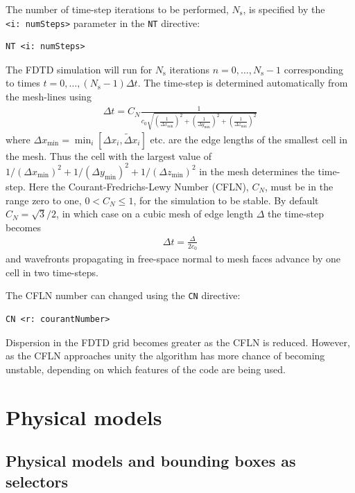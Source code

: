 \documentclass[onecolumn,a4paper]{article}
\numberwithin{equation}{section}
\begin{document}
The number of time-step iterations to be performed, $N_\mathrm{s}$, is specified by the
\texttt{<i:~numSteps>} parameter in the \texttt{NT} directive:
\begin{verbatim}
NT <i: numSteps>
\end{verbatim}
The FDTD simulation will run for $N_\mathrm{s}$ iterations $n=0,\ldots,N_\mathrm{s}-1$ 
corresponding to times $t=0,\ldots,(N_\mathrm{s}-1)\Delta t$. The time-step is determined
automatically from the mesh-lines using
\begin{eqnarray}
\Delta t = C_N \frac{1}{c_0 \sqrt{ 
\left(\frac{1}{\Delta x_\mathrm{min}}\right)^2 
+\left(\frac{1}{\Delta y_\mathrm{min}}\right)^2
+\left(\frac{1}{\Delta z_\mathrm{min}}\right)^2
} }
\label{eq:ttimestep}
\end{eqnarray}
where $\Delta x_\mathrm{min} = \min_i [ \Delta x_i ,\tilde{\Delta}x_i ]$ etc. are the edge lengths of the
smallest cell in the mesh. Thus the cell with the largest value of $1/(\Delta x_\mathrm{min})^2 
+1/(\Delta y_\mathrm{min})^2+1/(\Delta z_\mathrm{min})^2$ in the mesh determines the time-step. Here the 
Courant-Fredrichs-Lewy Number (CFLN), $C_N$, must be in the range zero to one, $0<C_N\le1$, for the simulation to be stable. By 
default $C_N=\sqrt{3}/2$, in which case on a cubic mesh of edge length $\Delta$ the time-step becomes
\begin{eqnarray}
\Delta t = \frac{\Delta}{2 c_0}
\label{eq:ttimestep2}
\end{eqnarray}
and wavefronts propagating in free-space normal to mesh faces advance by one cell in two time-steps.

The CFLN number can changed using the \texttt{CN} directive:
\begin{verbatim}
CN <r: courantNumber>
\end{verbatim}
Dispersion in the FDTD grid becomes greater as the CFLN is reduced. However, as the CFLN
approaches unity the algorithm has more chance of becoming unstable, depending on which features of the code
are being used.

%
%
\section{Physical models}
\label{sc:phymod}
%
%

\subsection{Physical models and bounding boxes as selectors}
\end{document}
